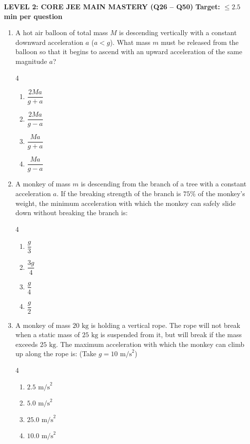 \documentclass[11pt,a4paper]{article}
\begin{document}
\begin{tcolorbox}[l2banner]
  {\large \textbf{\textsf{LEVEL 2: CORE JEE MAIN MASTERY (Q26 -- Q50)}}} \hfill {\small \textbf{Target: $\le 2.5$ min per question}}
\end{tcolorbox}
\vspace{4pt}

\begin{enumerate}[label=\textbf{\arabic*.},leftmargin=18pt,itemsep=8pt,resume]

  \item A hot air balloon of total mass $M$ is descending vertically with a constant downward acceleration $a$ ($a < g$). What mass $m$ must be released from the balloon so that it begins to ascend with an upward acceleration of the same magnitude $a$?
  \begin{multicols}{4}
    \begin{enumerate}[label=(\Alph*)]
      \item $\dfrac{2Ma}{g + a}$
      \item $\dfrac{2Ma}{g - a}$
      \item $\dfrac{Ma}{g + a}$
      \item $\dfrac{Ma}{g - a}$
    \end{enumerate}
  \end{multicols}

  \item A monkey of mass $m$ is descending from the branch of a tree with a constant acceleration $a$. If the breaking strength of the branch is $75\%$ of the monkey's weight, the minimum acceleration with which the monkey can safely slide down without breaking the branch is:
  \begin{multicols}{4}
    \begin{enumerate}[label=(\Alph*)]
      \item $\dfrac{g}{3}$
      \item $\dfrac{3g}{4}$
      \item $\dfrac{g}{4}$
      \item $\dfrac{g}{2}$
    \end{enumerate}
  \end{multicols}

  \item A monkey of mass $20\text{ kg}$ is holding a vertical rope. The rope will not break when a static mass of $25\text{ kg}$ is suspended from it, but will break if the mass exceeds $25\text{ kg}$. The maximum acceleration with which the monkey can climb up along the rope is: (Take $g = 10\text{ m/s}^2$)
  \begin{multicols}{4}
    \begin{enumerate}[label=(\Alph*)]
      \item $2.5\text{ m/s}^2$
      \item $5.0\text{ m/s}^2$
      \item $25.0\text{ m/s}^2$
      \item $10.0\text{ m/s}^2$
    \end{enumerate}
  \end{multicols}


\end{enumerate}
\end{document}

